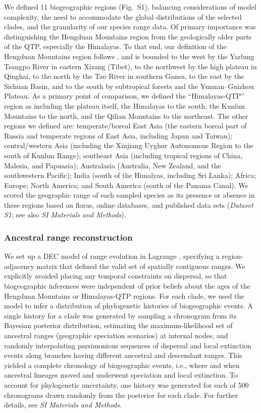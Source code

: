 We defined 11 biogeographic regions (Fig.~S1), balancing considerations of model complexity, the need to accommodate the global distributions of the selected clades, and the granularity of our species range data. Of primary importance was distinguishing the Hengduan Mountains region from the geologically older parts of the QTP, especially the Himalayas. To that end, our definition of the Hengduan Mountains region follows \citet{Boufford2014}, and is bounded to the west by the Yarlung Tsangpo River in eastern Xizang (Tibet), to the northwest by the high plateau in Qinghai, to the north by the Tao River in southern Gansu, to the east by the Sichuan Basin, and to the south by subtropical forests and the Yunnan–Guizhou Plateau. As a primary point of comparison, we defined the ``Himalayas-QTP'' region as including the plateau itself, the Himalayas to the south, the Kunlun Mountains to the north, and the Qilian Mountains to the northeast. The other regions we defined are: temperate/boreal East Asia (the eastern boreal part of Russia and temperate regions of East Asia, including Japan and Taiwan); central/western Asia (including the Xinjiang Uyghur Autonomous Region to the south of Kunlun Range); southeast Asia (including tropical regions of China, Malesia, and Papuasia); Australasia (Australia, New Zealand, and the southwestern Pacific); India (south of the Himalyas, including Sri Lanka); Africa; Europe; North America; and South America (south of the Panama Canal). We scored the geographic range of each sampled species as its presence or absence in these regions based on floras, online databases, and published data sets (\textit{Dataset S1}; see also \textit{SI Materials and Methods}).

\subsubsection{Ancestral range reconstruction}

We set up a DEC model of range evolution in Lagrange \citep{Ree2005,Ree2008}, specifying a region-adjacency matrix that defined the valid set of spatially contiguous ranges. We explicitly avoided placing any temporal constraints on dispersal, so that biogeographic inferences were independent of prior beliefs about the ages of the Hengduan Mountains or Himalayas-QTP regions. For each clade, we used the model to infer a distribution of phylogenetic histories of biogeographic events. A single history for a clade was generated by sampling a chronogram from its Bayesian posterior distribution, estimating the maximum-likelihood set of ancestral ranges (geographic speciation scenarios) at internal nodes, and randomly interpolating parsimonious sequences of dispersal and local extinction events along branches having different ancestral and descendant ranges. This yielded a complete chronology of biogeographic events, i.e., where and when ancestral lineages moved and underwent speciation and local extinction. To account for phylogenetic uncertainty, one history was generated for each of 500 chronograms drawn randomly from the posterior for each clade. For further details, see \textit{SI Materials and Methods}.

